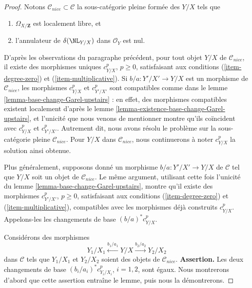 \begin{proof}
\medskip\noindent
Notons $\mathcal{C}_{nice} \subset \mathcal{C}$ la sous-catégorie pleine
formée des $Y/X$ tels que
\begin{enumerate}
\item $\Omega_{X/\mathbf{Z}}$ est localement libre, et
\item l'annulateur de $\delta(\NL_{Y/X})$ dans $\mathcal{O}_Y$ est nul.
\end{enumerate}
D'après les observations du paragraphe précédent, pour tout
objet $Y/X$ de $\mathcal{C}_{nice}$, il existe des morphismes uniques
$c^p_{Y/X}$, $p \geq 0$, satisfaisant aux conditions (\ref{item-degree-zero})
et (\ref{item-multiplicative}). Si $b/a : Y'/X' \to Y/X$
est un morphisme de $\mathcal{C}_{nice}$, les morphismes
$c^p_{Y/X}$ et $c^p_{Y'/X'}$ sont compatibles comme dans le
lemme \ref{lemma-base-change-Garel-upstairs} : en effet,
des morphismes compatibles existent localement d'après le
lemme \ref{lemma-existence-base-change-Garel-upstairs},
et l'unicité que nous venons de mentionner montre qu'ils coïncident
avec $c^p_{Y/X}$ et $c^p_{Y'/X'}$.
Autrement dit, nous avons résolu le problème
sur la sous-catégorie pleine $\mathcal{C}_{nice}$. Pour $Y/X$ dans $\mathcal{C}_{nice}$,
nous continuerons à noter $c^p_{Y/X}$ la solution ainsi obtenue.

\medskip\noindent
Plus généralement, supposons donné un morphisme $b/a : Y'/X' \to Y/X$
de $\mathcal{C}$ tel que $Y/X$ soit un objet de $\mathcal{C}_{nice}$.
Le même argument, utilisant cette fois l'unicité du
lemme \ref{lemma-base-change-Garel-upstairs}, montre qu'il existe des
morphismes $c^p_{Y'/X'}$, $p \geq 0$, satisfaisant aux conditions (\ref{item-degree-zero})
et (\ref{item-multiplicative}), compatibles avec les morphismes déjà construits
$c^p_{Y/X}$. Appelons-les les changements de base
$(b/a)^*c^p_{Y/X}$.

\medskip\noindent
Considérons des morphismes
$$
Y_1/X_1 \xleftarrow{b_1/a_1} Y/X \xrightarrow{b_2/a_2} Y_2/X_2
$$
dans $\mathcal{C}$ tels que $Y_1/X_1$ et $Y_2/X_2$ soient des objets
de $\mathcal{C}_{nice}$.
{\bf Assertion.} Les deux changements de base $(b_i/a_i)^*c^p_{Y_i/X_i}$, $i = 1, 2$,
sont égaux. Nous montrerons d'abord que cette assertion entraîne le lemme,
puis nous la démontrerons.


\end{proof}
